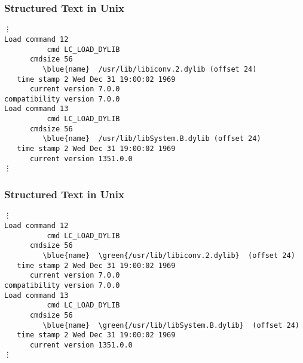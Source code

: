 \documentclass{beamer}
\begin{document}
\begin{frame}[fragile]
  \frametitle{Structured Text in Unix}
    \begin{Verbatim}[commandchars=\\\{\}]
 % otool -l $(locate librure.dylib)
⋮
Load command 12
          cmd LC_LOAD_DYLIB
      cmdsize 56
         \blue{name}  /usr/lib/libiconv.2.dylib (offset 24)
   time stamp 2 Wed Dec 31 19:00:02 1969
      current version 7.0.0
compatibility version 7.0.0
Load command 13
          cmd LC_LOAD_DYLIB
      cmdsize 56
         \blue{name}  /usr/lib/libSystem.B.dylib (offset 24)
   time stamp 2 Wed Dec 31 19:00:02 1969
      current version 1351.0.0
⋮
    \end{Verbatim}
\end{frame}

\begin{frame}[fragile]
  \frametitle{Structured Text in Unix}
    \begin{Verbatim}[commandchars=\\\{\}]
 % otool -l $(locate librure.dylib)
⋮
Load command 12
          cmd LC_LOAD_DYLIB
      cmdsize 56
         \blue{name}  \green{/usr/lib/libiconv.2.dylib}  (offset 24)
   time stamp 2 Wed Dec 31 19:00:02 1969
      current version 7.0.0
compatibility version 7.0.0
Load command 13
          cmd LC_LOAD_DYLIB
      cmdsize 56
         \blue{name}  \green{/usr/lib/libSystem.B.dylib}  (offset 24)
   time stamp 2 Wed Dec 31 19:00:02 1969
      current version 1351.0.0
⋮
    \end{Verbatim}
\end{frame}
\end{document}
